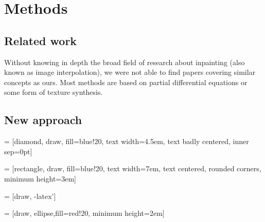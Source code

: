 \documentclass[10pt,conference,compsocconf]{IEEEtran}
\begin{document}
\section{Methods}
\subsection{Related work}
Without knowing in depth the broad field of research about inpainting (also known as image interpolation), we were not able to find papers covering similar concepts as ours. Most methods are based on partial differential equations or some form of texture synthesis.

\subsection{New approach}

 = [diamond, draw, fill=blue!20, 
    text width=4.5em, text badly centered, inner sep=0pt]

 = [rectangle, draw, fill=blue!20, 
    text width=7em, text centered, rounded corners, minimum height=3em]

 = [draw, -latex']

 = [draw, ellipse,fill=red!20,
    minimum height=2em]
    
\end{document}
